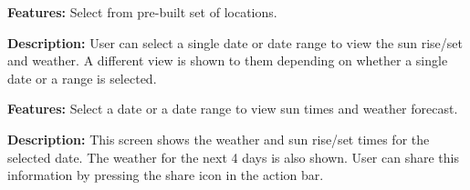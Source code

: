 \documentclass[11pt,english,numbers=endperiod,parskip=half]{scrartcl}
\begin{document}
\textbf{Features: }Select from pre-built set of locations.

\begin{figure}[H]
\end{figure}
\bigskip
\textbf{Description: }User can select a single date or date range to view the
sun rise/set and weather. A different view is shown to them depending on whether
a single date or a range is selected.

\textbf{Features: }Select a date or a date range to view sun times and weather forecast.

\begin{figure}[H]
\end{figure}
\bigskip
\textbf{Description: }This screen shows the weather and sun rise/set times for
the selected date. The weather for the next 4 days is also shown. User can share
this information by pressing the share icon in the action bar.
\end{document}
